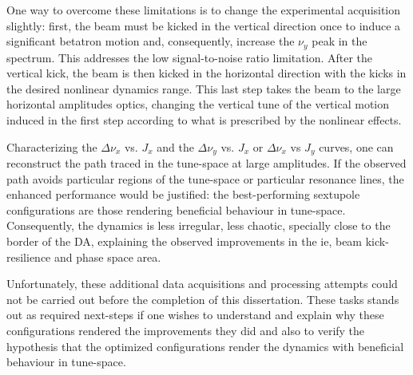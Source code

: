 One way to overcome these limitations is to change the experimental acquisition slightly: first, the beam must be kicked in the vertical direction  once to induce a significant betatron motion and, consequently, increase the $\nu_y$ peak in the spectrum. This addresses the low signal-to-noise ratio limitation. After the vertical kick, the beam is then kicked in the horizontal direction with the kicks in the desired nonlinear dynamics range. This last step takes the beam to the large horizontal amplitudes optics, changing the vertical tune of the vertical motion induced in the first step according to what is prescribed by the nonlinear effects.

Characterizing the $\Delta \nu_x$ vs. $J_x$ and the $\Delta \nu_y$ vs. $J_x$ or $\Delta \nu_x$ vs $J_y$ curves, one can reconstruct the path traced in the tune-space at large amplitudes. If the observed path avoids particular regions of the tune-space or particular resonance lines, the enhanced performance would be justified: the best-performing sextupole configurations are those rendering beneficial behaviour in tune-space. Consequently, the dynamics is less irregular, less chaotic, specially close to the border of the \gls*{DA}, explaining the observed improvements in the \gls*{ie}, beam kick-resilience and phase space area.

Unfortunately, these additional data acquisitions and processing attempts could not be carried out before the completion of this dissertation. These tasks stands out as required next-steps if one wishes to understand and explain why these configurations rendered the improvements they did and also to verify the hypothesis that the optimized configurations render the dynamics with beneficial behaviour in tune-space.

